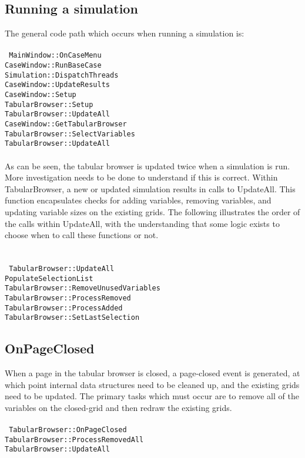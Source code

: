\documentclass[11pt]{article} %
\begin{document}
\subsection{Running a simulation}
The general code path which occurs when running a simulation is:\\
\\
\texttt{
MainWindow::OnCaseMenu \\
\indent CaseWindow::RunBaseCase \\
 \indent \indent	Simulation::DispatchThreads \\
 \indent \indent		CaseWindow::UpdateResults \\
 \indent \indent \indent			CaseWindow::Setup \\
 \indent \indent \indent \indent			TabularBrowser::Setup \\
 \indent \indent \indent \indent \indent				TabularBrowser::UpdateAll \\
 \indent \indent \indent			CaseWindow::GetTabularBrowser \\
 \indent \indent \indent \indent				TabularBrowser::SelectVariables \\
 \indent \indent \indent \indent \indent					TabularBrowser::UpdateAll \\
}
\\
As can be seen, the tabular browser is updated twice when a simulation is run.  More investigation needs to be done to understand if this is correct. Within TabularBrowser, a new or updated simulation results in calls to UpdateAll.  This function encapsulates checks for adding variables, removing variables, and updating variable sizes on the existing grids. The following illustrates the order of the calls within UpdateAll, with the understanding that some logic exists to choose when to call these functions or not.  \\
\\
\\
\texttt{
TabularBrowser::UpdateAll \\
\indent PopulateSelectionList \\
\indent TabularBrowser::RemoveUnusedVariables \\
\indent TabularBrowser::ProcessRemoved \\
\indent TabularBrowser::ProcessAdded \\
\indent TabularBrowser::SetLastSelection \\
}
\subsection{OnPageClosed}
When a page in the tabular browser is closed, a page-closed event is generated, at which point internal data structures need to be cleaned up, and the existing grids need to be updated. The primary tasks which must occur are to remove all of the variables on the closed-grid and then redraw the existing grids.\\
\\
\texttt{
TabularBrowser::OnPageClosed \\
\indent TabularBrowser::ProcessRemovedAll \\
\indent TabularBrowser::UpdateAll
}
\end{document}
